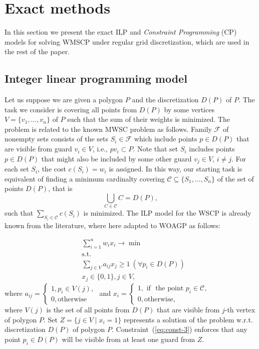 \documentclass[runningheads,a4paper]{elsarticle}
\begin{document}
	\section{Exact methods}
	In this section we present the exact ILP and \emph{Constraint Programming} (CP) models for solving WMSCP  under regular grid discretization, which are used  in the rest of the paper.
	\subsection{Integer linear programming model}
	Let us suppose we are given a polygon $P$ and the discretization $D(P)$ of $P$.  The task we consider is covering all points from $D(P)$ by some vertices $V=\{v_1,...,v_n\}$ of $P$ such that the sum of their weights is minimized.
	The problem is related to the known MWSC problem as follows.
	Family $\mathcal{F}$ of nonempty sets consists of the sets
	$S_i \in \mathcal{F}$ which include points $p \in D(P)$ that are visible from guard $v_i\in V$, i.e., $pv_i \subset P$.  Note that set $S_i$ includes points $p\in D(P)$ that might also be included by some other guard $v_j\in V$, $i \neq j$. For each set $S_i$, the cost $c(S_i) = w_i$ is assigned.  In this way, our starting task is equivalent of finding a minimum cardinalty covering $\mathcal{C}\subseteq\{S_1,...,S_n\}$ of the set of points $D(P)$, that is
	$$ \bigcup_{C \in \mathcal{C}} C = D(P),$$ such that $\sum_{S_i \in \mathcal{C}} c(S_i)$ is minimized.  The ILP  model for the WSCP is already known from the literature, where  here adapted to WOAGP  as follows:

	\begin{align}
	&\sum_{i=1}^n w_ix_i \longrightarrow \min \\
	&\mbox{s.t.} \\
	&\sum_{j\in V} a_{ij}x_j \geq 1\ (\forall p_i\in D(P)) \label{eq:const-3}\\
	& x_j \in \{0,1\}, j \in V,
	\end{align}
	where
	$a_{ij} = \begin{cases}
	1, p_i \in V(j), \\
	0, \mbox{otherwise}
	\end{cases}$
	and $x_i = \begin{cases}
	1, \mbox{ if } \mbox{ the point } p_i \in \mathcal{C},\\
	0, \mbox{otherwise},
	\end{cases}$ \\

	where $V(j)$ is the set of all points from $D(P)$ that are visible from $j$-th vertex of polygon $P$.
	Set $Z = \{j \in V\mid x_i=1\}$ represents a solution of the problem w.r.t. discretization $D(P)$ of polygon $P$.
	Constraint~(\ref{eq:const-3}) enforces that any point $p_i \in D(P)$ will be visible from at least one guard from $Z$.
	
\end{document}
